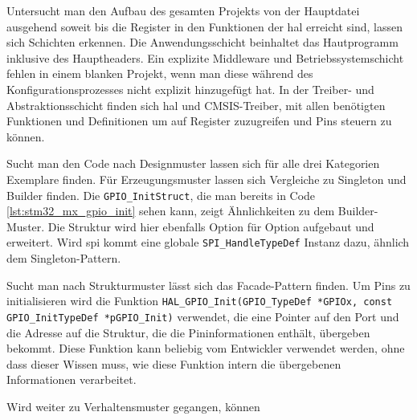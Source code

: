 Untersucht man den Aufbau des gesamten Projekts von der Hauptdatei ausgehend soweit bis die Register in den Funktionen der \gls{hal} erreicht sind, lassen sich Schichten erkennen.
Die Anwendungsschicht beinhaltet das Hautprogramm inklusive des Hauptheaders.
Ein explizite Middleware und Betriebssystemschicht fehlen in einem blanken Projekt, wenn man diese während des Konfigurationsprozesses nicht explizit hinzugefügt hat.
In der Treiber- und Abstraktionsschicht finden sich \gls{hal} und CMSIS-Treiber, mit allen benötigten Funktionen und Definitionen um auf Register zuzugreifen und Pins steuern zu können. 

Sucht man den Code nach Designmuster lassen sich für alle drei Kategorien Exemplare finden.
Für Erzeugungsmuster lassen sich Vergleiche zu Singleton und Builder finden.
Die \texttt{GPIO\_InitStruct}, die man bereits in Code \ref{lst:stm32_mx_gpio_init} sehen kann, zeigt Ähnlichkeiten zu dem Builder-Muster.
Die Struktur wird hier ebenfalls Option für Option aufgebaut und erweitert.
Wird \gls{spi} kommt eine globale \texttt{SPI\_HandleTypeDef} Instanz dazu, ähnlich dem Singleton-Pattern.

Sucht man nach Strukturmuster lässt sich das Facade-Pattern finden.
Um Pins zu initialisieren wird die Funktion \texttt{HAL\_GPIO\_Init(GPIO\_TypeDef  *GPIOx, const GPIO\_InitTypeDef *pGPIO\_Init)} verwendet, die eine Pointer auf den Port und die Adresse auf die Struktur, die die Pininformationen enthält, übergeben bekommt.
Diese Funktion kann beliebig vom Entwickler verwendet werden, ohne dass dieser Wissen muss, wie diese Funktion intern die übergebenen Informationen verarbeitet.

Wird weiter zu Verhaltensmuster gegangen, können 




